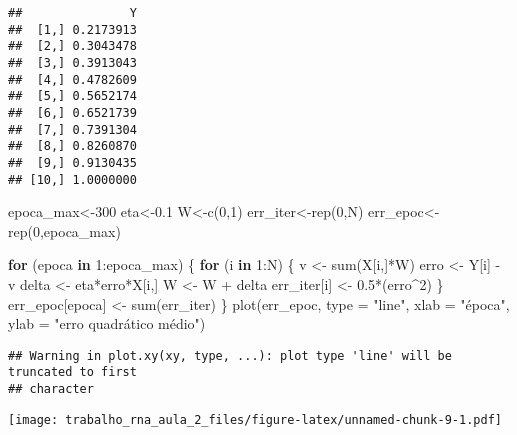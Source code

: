 \documentclass[
]{article}
\newenvironment{Shaded}{\begin{snugshade}}{\end{snugshade}}
\newcommand{\AttributeTok}[1]{\textcolor[rgb]{0.77,0.63,0.00}{#1}}
\newcommand{\ControlFlowTok}[1]{\textcolor[rgb]{0.13,0.29,0.53}{\textbf{#1}}}
\newcommand{\DecValTok}[1]{\textcolor[rgb]{0.00,0.00,0.81}{#1}}
\newcommand{\FloatTok}[1]{\textcolor[rgb]{0.00,0.00,0.81}{#1}}
\newcommand{\FunctionTok}[1]{\textcolor[rgb]{0.00,0.00,0.00}{#1}}
\newcommand{\NormalTok}[1]{#1}
\newcommand{\OtherTok}[1]{\textcolor[rgb]{0.56,0.35,0.01}{#1}}
\newcommand{\SpecialCharTok}[1]{\textcolor[rgb]{0.00,0.00,0.00}{#1}}
\newcommand{\StringTok}[1]{\textcolor[rgb]{0.31,0.60,0.02}{#1}}
\begin{document}
\begin{verbatim}
##               Y
##  [1,] 0.2173913
##  [2,] 0.3043478
##  [3,] 0.3913043
##  [4,] 0.4782609
##  [5,] 0.5652174
##  [6,] 0.6521739
##  [7,] 0.7391304
##  [8,] 0.8260870
##  [9,] 0.9130435
## [10,] 1.0000000
\end{verbatim}

\begin{Shaded}
\begin{Highlighting}[]
\NormalTok{epoca\_max}\OtherTok{\textless{}{-}}\DecValTok{300}
\NormalTok{eta}\OtherTok{\textless{}{-}}\FloatTok{0.1}
\NormalTok{W}\OtherTok{\textless{}{-}}\FunctionTok{c}\NormalTok{(}\DecValTok{0}\NormalTok{,}\DecValTok{1}\NormalTok{)}
\NormalTok{err\_iter}\OtherTok{\textless{}{-}}\FunctionTok{rep}\NormalTok{(}\DecValTok{0}\NormalTok{,N)}
\NormalTok{err\_epoc}\OtherTok{\textless{}{-}}\FunctionTok{rep}\NormalTok{(}\DecValTok{0}\NormalTok{,epoca\_max)}

\ControlFlowTok{for}\NormalTok{ (epoca }\ControlFlowTok{in} \DecValTok{1}\SpecialCharTok{:}\NormalTok{epoca\_max) \{}
  \ControlFlowTok{for}\NormalTok{ (i }\ControlFlowTok{in} \DecValTok{1}\SpecialCharTok{:}\NormalTok{N) \{}
\NormalTok{    v }\OtherTok{\textless{}{-}} \FunctionTok{sum}\NormalTok{(X[i,]}\SpecialCharTok{*}\NormalTok{W)}
\NormalTok{    erro }\OtherTok{\textless{}{-}}\NormalTok{ Y[i] }\SpecialCharTok{{-}}\NormalTok{ v}
\NormalTok{    delta }\OtherTok{\textless{}{-}}\NormalTok{ eta}\SpecialCharTok{*}\NormalTok{erro}\SpecialCharTok{*}\NormalTok{X[i,]}
\NormalTok{    W }\OtherTok{\textless{}{-}}\NormalTok{ W }\SpecialCharTok{+}\NormalTok{ delta}
\NormalTok{    err\_iter[i] }\OtherTok{\textless{}{-}} \FloatTok{0.5}\SpecialCharTok{*}\NormalTok{(erro}\SpecialCharTok{\^{}}\DecValTok{2}\NormalTok{)}
\NormalTok{  \}}
\NormalTok{  err\_epoc[epoca] }\OtherTok{\textless{}{-}} \FunctionTok{sum}\NormalTok{(err\_iter)}
\NormalTok{\}}
\FunctionTok{plot}\NormalTok{(err\_epoc, }\AttributeTok{type =} \StringTok{"line"}\NormalTok{, }\AttributeTok{xlab =} \StringTok{"época"}\NormalTok{, }\AttributeTok{ylab =} \StringTok{"erro quadrático médio"}\NormalTok{)}
\end{Highlighting}
\end{Shaded}

\begin{verbatim}
## Warning in plot.xy(xy, type, ...): plot type 'line' will be truncated to first
## character
\end{verbatim}

\texttt{[image: trabalho\_rna\_aula\_2\_files/figure-latex/unnamed-chunk-9-1.pdf]}
\end{document}

